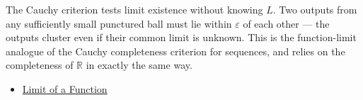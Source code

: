 \begin{remark*}[Interpretation]
The Cauchy criterion tests limit existence without knowing $L$. Two
outputs from any sufficiently small punctured ball must lie within
$\varepsilon$ of each other --- the outputs cluster even if their
common limit is unknown. This is the function-limit analogue of the
Cauchy completeness criterion for sequences, and relies on the
completeness of $\mathbb{R}$ in exactly the same way.
\end{remark*}

\begin{dependencies}
\begin{itemize}
  \item \hyperref[def:limit-function]{Limit of a Function}
\end{itemize}
\end{dependencies}
